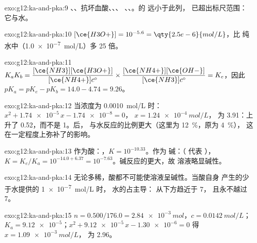 \begin{solution}{exo:g12:ka-and-pka:9}
、、抗坏血酸、、、
、、。的  远小于此列，
已超出标尺范围：它与水。
\end{solution}

\begin{solution}{exo:g12:ka-and-pka:10}
$[\ce{H3O+}] = 10^{-5.6} = \qty{2.5e-6}{mol/L}$，比
纯水中（\qty{1.0e-7}{mol/L}）多 25 倍。
\end{solution}

\begin{solution}{exo:g12:ka-and-pka:11}
$K_a K_b = \dfrac{[\ce{NH3}][\ce{H3O+}]}{[\ce{NH4+}]c^\circ} \times
\dfrac{[\ce{NH4+}][\ce{OH-}]}{[\ce{NH3}]c^\circ} = K_e$，因此
$pK_a = pK_e - pK_b = 14.0 - 4.74 = 9.26$。
\end{solution}

\begin{solution}{exo:g12:ka-and-pka:12}
当浓度为 \qty{0.0010}{mol/L} 时：$x^2 + \num{1.74e-5}\,x - \num{1.74e-8} = 0$，
$x = \qty{1.24e-4}{mol/L}$， 为 3.91：上升了 0.52，而不是 1。后，
与水反应的比例更大（这里为
\qty{12}{\percent}，原为 \qty{4}{\percent}），
这在一定程度上弥补了的影响。
\end{solution}

\begin{solution}{exo:g12:ka-and-pka:13}
作为酸：，$K = 10^{-10.33}$。作为
碱：（ 代表 ），$K = K_e/K_a = 10^{-14.0+6.37}
= 10^{-7.63}$。碱反应的更大，故
溶液略显碱性。
\end{solution}

\begin{solution}{exo:g12:ka-and-pka:14}
无论多稀，酸都不可能使溶液呈碱性。当酸自身
产生的少于水提供的 \qty{1e-7}{mol/L} 时，
水的占主导： 从下方趋近于 7，
且永不越过 7。
\end{solution}

\begin{solution}{exo:g12:ka-and-pka:15}
$n = 0.500 / 176.0 = \qty{2.84e-3}{mol}$，$c = \qty{0.0142}{mol/L}$；
$K_a = \num{9.12e-5}$；$x^2 + \num{9.12e-5}\,x - \num{1.30e-6} = 0$ 得
$x = \qty{1.09e-3}{mol/L}$， 为 2.96。
\end{solution}

